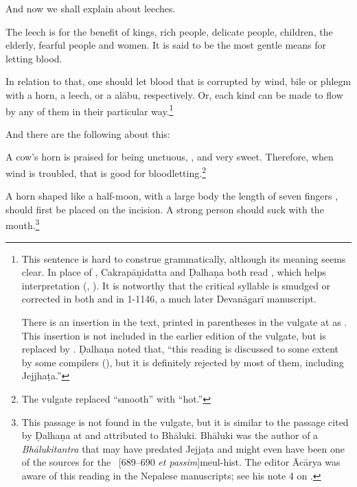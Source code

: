 \begin{translation}    
\item [1] 
    And now we shall explain  about leeches.
    
\item [2 {[3]}]The leech is for the benefit of kings, rich people, 
delicate people,
children, the elderly, fearful people and women.  It is said to be the most
gentle means for letting blood. 

\item [4]

In relation to that, one should let blood that is corrupted by wind, bile or
phlegm with a horn, a leech, or a \gls{alābu}, respectively.   Or, each kind
can be made to flow by any of them in their particular way.\footnote{This
    sentence is hard to construe grammatically, although its meaning seems
    clear. In place of , Cakrapāṇidatta and Ḍalhaṇa both read
    , which helps interpretation (\cite[95]{acar-1939},
    \cite[55]{vulgate}). It is notworthy that the critical syllable  is
    smudged or corrected in both  and in 1-1146, a
    much later Devanāgarī manuscript.
      
There is an insertion in the text, printed in parentheses in the
vulgate at  as  .  This insertion is not included in the
earlier edition of the vulgate, but is replaced by
 \citep[54]{susr-trikamji2}. Ḍalhaṇa noted that,
“this reading is discussed to some extent by some compilers
(), but it is definitely rejected by most of them,
including Jejjhaṭa.” }



\item [5]
And there are the following about this:

\begin{sloka}
    A cow's horn is praised for being unctuous, , and very
sweet.  Therefore, when wind is troubled, that is good for
bloodletting.\footnote{The vulgate replaced “smooth” with “hot.”}
\end{sloka}

\item [5a]

\begin{sloka}
    A horn shaped like a half-moon,
    with a large body the length of seven fingers , should first be placed on the 
    incision.  A strong person should 
    suck with
the mouth.\footnote{This passage is not found in the vulgate, but it is
    similar to the passage cited by Ḍalhaṇa at  and attributed to
    Bhāluki.  Bhāluki was the author of a \emph{Bhālukitantra} that may have
    predated Jejjaṭa and might even have been one of the sources for the \SS\
    [689--690 \emph{et passim}]{meul-hist}. The editor Ācārya was
    aware of this reading in the Nepalese manuscripts; see his note 4 on
    \Su{1.13.5}{55, note 4}.}
\end{sloka}


\end{translation}

